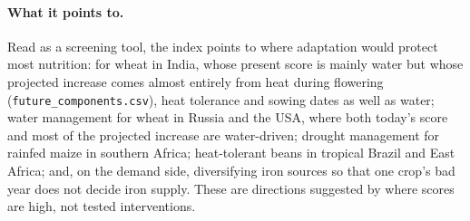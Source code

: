 \paragraph{What it points to.} Read as a screening tool, the index points to where adaptation would protect
most nutrition: for wheat in India, whose present score is mainly water but whose projected increase comes
almost entirely from heat during flowering (\texttt{future\_components.csv}), heat tolerance and sowing dates
as well as water; water management for wheat in Russia and the USA, where both today's score and most of the
projected increase are water-driven; drought management for rainfed maize in southern Africa; heat-tolerant beans in
tropical Brazil and East Africa; and, on the demand side, diversifying iron sources so that one crop's bad
year does not decide iron supply. These are directions suggested by where scores are high, not tested
interventions.

